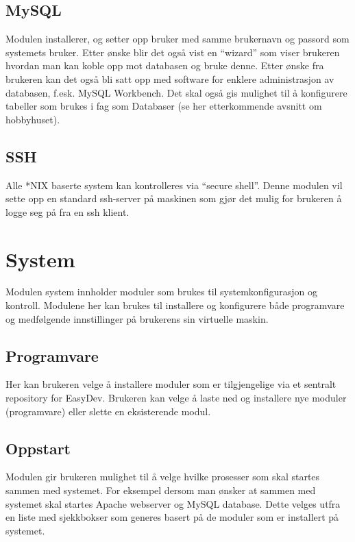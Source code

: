 \subsection{MySQL}
Modulen installerer, og setter opp bruker med samme brukernavn og passord som systemets  bruker. Etter ønske blir det også vist en “wizard” som viser brukeren hvordan man kan koble opp mot databasen og bruke denne. Etter ønske fra brukeren kan det også bli satt opp med software for enklere administrasjon av databasen, f.esk. MySQL Workbench. Det skal også gis mulighet til å konfigurere tabeller som brukes i fag som Databaser (se her etterkommende avsnitt om hobbyhuset). 

\subsection{SSH}
Alle *NIX baserte system kan kontrolleres via “secure shell”. Denne modulen vil sette opp en standard ssh-server på maskinen som gjør det mulig for brukeren å logge seg på fra en ssh klient.

\section{System}
Modulen system innholder moduler som brukes til systemkonfigurasjon og kontroll. Modulene her kan brukes til installere og konfigurere både programvare og medfølgende innstillinger på brukerens sin virtuelle maskin. 

\subsection{Programvare}
Her kan brukeren velge å installere moduler som er tilgjengelige via et sentralt repository for EasyDev. Brukeren kan velge å laste ned og installere nye moduler (programvare) eller slette en eksisterende modul.

\subsection{Oppstart}
Modulen gir brukeren mulighet til å velge hvilke prosesser som skal startes sammen med systemet. For eksempel dersom man ønsker at sammen med systemet skal startes Apache webserver og MySQL database. Dette velges utfra en liste med sjekkbokser som generes basert på de moduler som er installert på systemet.

